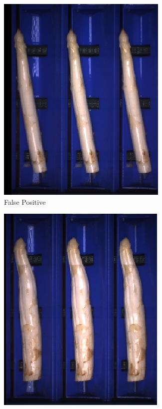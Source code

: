 \begin{figure}[h]
	\begin{subfigure}{0.3\textwidth}
		\includegraphics[width=0.9\linewidth]{Figures/appendix/rustyhead_falsepositive_01.png}
		\vspace{-5pt}
		\caption{False Positive}
	\end{subfigure}
	\begin{subfigure}{0.3\textwidth}
		\includegraphics[width=0.9\linewidth]{Figures/appendix/rustyhead_falsepositive_02.png}

\end{subfigure}
\end{figure}
